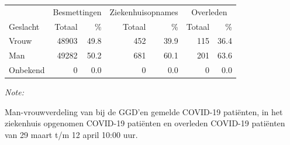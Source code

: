 \documentclass[
  english,
  man,floatsintext]{apa6}
\begin{document}
\begin{table}
\centering\begingroup\fontsize{11}{13}\selectfont

\begin{threeparttable}
\begin{tabular}{lrrrrrr}
\toprule
\multicolumn{1}{c}{ } & \multicolumn{2}{c}{Besmettingen} & \multicolumn{2}{c}{Ziekenhuisopnames} & \multicolumn{2}{c}{Overleden} \\
\cmidrule(l{3pt}r{3pt}){2-3} \cmidrule(l{3pt}r{3pt}){4-5} \cmidrule(l{3pt}r{3pt}){6-7}
Geslacht & Totaal & \% & Totaal & \% & Totaal & \%\\
\midrule
Vrouw & 48903 & 49.8 & 452 & 39.9 & 115 & 36.4\\
Man & 49282 & 50.2 & 681 & 60.1 & 201 & 63.6\\
Onbekend & 0 & 0.0 & 0 & 0.0 & 0 & 0.0\\
\bottomrule
\end{tabular}
\begin{tablenotes}
\item \textit{Note: } 
\item Man-vrouwverdeling van bij de GGD’en gemelde COVID-19 patiënten, in het ziekenhuis opgenomen COVID-19 patiënten en overleden COVID-19 patiënten van 29 maart t/m 12 april 10:00 uur.
\end{tablenotes}
\end{threeparttable}
\endgroup{}
\end{table}
\newpage
\end{document}
